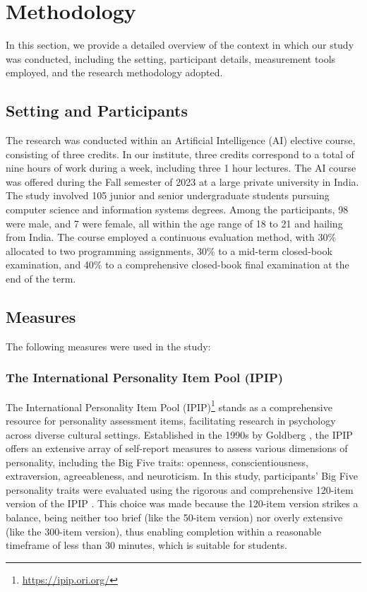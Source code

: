 \section{Methodology} \label{sec:method}

In this section, we provide a detailed overview of the context in which our study was conducted, including the setting, participant details, measurement tools employed, and the research methodology adopted.

\subsection{Setting and Participants}
The research was conducted within an Artificial Intelligence (AI) elective course, consisting of three credits. In our institute, three credits correspond to a total of nine hours of work during a week, including three 1 hour lectures. The AI course was offered during the Fall semester of 2023 at a large private university in India. The study involved 105 junior and senior undergraduate students pursuing computer science and information systems degrees. Among the participants, 98 were male, and 7 were female, all within the age range of 18 to 21 and hailing from India. The course employed a continuous evaluation method, with 30\% allocated to two programming assignments, 30\% to a mid-term closed-book examination, and 40\% to a comprehensive closed-book final examination at the end of the term.

\subsection{Measures}
The following measures were used in the study:
\subsubsection{The International Personality Item Pool (IPIP)}
The International Personality Item Pool (IPIP)\footnote{\url{https://ipip.ori.org/}} stands as a comprehensive resource for personality assessment items, facilitating research in psychology across diverse cultural settings. Established in the 1990s by Goldberg \cite{Goldberg}, the IPIP offers an extensive array of self-report measures to assess various dimensions of personality, including the Big Five traits: openness, conscientiousness, extraversion, agreeableness, and neuroticism. In this study, participants' Big Five personality traits were evaluated using the rigorous and comprehensive 120-item version of the IPIP \cite{JOHNSON201478}. This choice was made because the 120-item version strikes a balance, being neither too brief (like the 50-item version) nor overly extensive (like the 300-item version), thus enabling completion within a reasonable timeframe of less than 30 minutes, which is suitable for students.

